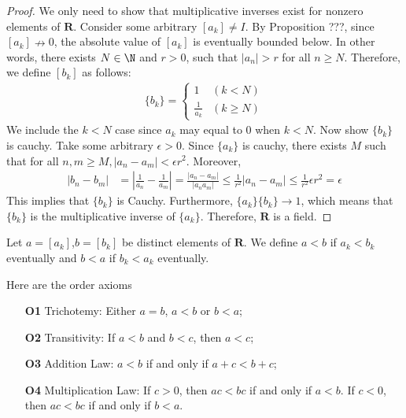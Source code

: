 \documentclass[10pt]{article}
\begin{document}
\begin{proof}
    We only need to show that multiplicative inverses exist for nonzero elements of $\mathbf{R}$. Consider some arbitrary $[a_k] \neq I$. By Proposition ???, since $[a_k]\nrightarrow 0$, the absolute value of $[a_k]$ is eventually bounded below. In other words, there exists $N\in\N$ and $r > 0$, such that $|a_n| > r$ for all $n \geq N$. Therefore, we define $[b_k]$ as follows:
    \begin{align*}
        \{b_k\}=
        \begin{cases}
            1                   &(k < N)\\
            \frac{1}{a_k}       &(k \geq N)
        \end{cases}
    \end{align*}
    We include the $k < N$ case since $a_k$ may equal to $0$ when $k < N$. Now show $\{b_k\}$ is cauchy. Take some arbitrary $\epsilon>0$. Since $\{a_k\}$ is cauchy, there exists $M$ such that for all $n,m\geq M,|a_n-a_m|<\epsilon r^2$. Moreover,
    \begin{align*}
        |b_n-b_m|&=|\frac{1}{a_n} - \frac{1}{a_m}|=\frac{|a_n - a_m|}{|a_na_m|} \leq\frac{1}{r^2}|a_n - a_m|\leq\frac{1}{r^2}\epsilon r^2=\epsilon
    \end{align*}
    This implies that $\{b_k\}$ is Cauchy. Furthermore, $\{a_k\}\{b_k\}\rightarrow 1$, which means that $\{b_k\}$ is the multiplicative inverse of $\{a_k\}$. Therefore, $\mathbf{R}$ is a field.
\end{proof}
\begin{definition}
    Let $a=[a_k]$,$b=[b_k]$ be distinct elements of $\textbf{R}$. We define $a<b$ if $a_k <b_k$ eventually and $b<a$ if $b_k <a_k$ eventually.
\end{definition}
\begin{definition}
    Here are the order axioms
    \begin{enumerate}
        \item[\textbf{O1}] Trichotemy: Either $a = b$, $a < b$ or $b < a$;
        \item[\textbf{O2}] Transitivity: If $a < b$ and $b < c$, then $a < c$;
        \item[\textbf{O3}]Addition Law: $a < b$ if and only if $a + c < b + c$;
        \item[\textbf{O4}] Multiplication Law: If $c > 0$, then $ac < bc$ if and only if $a < b$. If $c < 0$, then $ac < bc$ if and only if $b < a$.
    \end{enumerate}
\end{definition}
\end{document}
